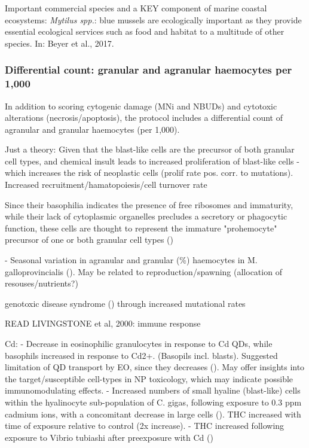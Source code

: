 Important commercial species and a KEY component of marine coastal ecosystems: \emph{Mytilus spp.}: blue mussels are ecologically important as they provide essential ecological services such as food and habitat to a multitude of other species. In: Beyer et al., 2017.


\subsubsection{Differential count: granular and agranular haemocytes per 1,000} %
In addition to scoring cytogenic damage (MNi and NBUDs) and cytotoxic alterations (necrosis/apoptosis), the protocol includes a differential count of agranular and granular haemocytes (per 1,000).

Just a theory: Given that the blast-like cells are the precursor of both granular cell types, and chemical insult leads to increased proliferation of blast-like cells - which increases the risk of neoplastic cells (prolif rate pos. corr. to mutations). Increased recruitment/hamatopoiesis/cell turnover rate

Since their basophilia indicates the presence of free ribosomes and immaturity, while their lack of cytoplasmic organelles precludes a secretory or phagocytic function, these cells are thought to represent the immature "prohemocyte" precursor of one or both granular cell types (\cite{Hine1999})

- Seasonal variation in agranular and granular (\%) haemocytes in M. galloprovincialis (\cite{Santarem1994}). May be related to reproduction/spawning (allocation of resouses/nutrients?)

genotoxic disease syndrome (\cite{Kurelec1993}) through increased mutational rates


READ LIVINGSTONE et al, 2000: immune response


Cd:
- Decrease in eosinophilic granulocytes in response to Cd QDs, while basophils increased in response to Cd2+. (Basopils incl. blasts). Suggested limitation of QD transport by EO, since they decreases (\cite{Rocha2014}). May offer insights into the target/susceptible cell-types in NP toxicology, which may indicate possible immunomodulating effects. %
- Increased numbers of small hyaline (blast-like) cells within the hyalinocyte sub-population of C. gigas, following exposure to 0.3 ppm cadmium ions, with a concomitant decrease in large cells (\cite{Auffret1994}). THC increased with time of exposure relative to control (2x increase). %
- THC increased following exposure to Vibrio tubiashi after preexposure with Cd (\cite{Pipe1995}) %



